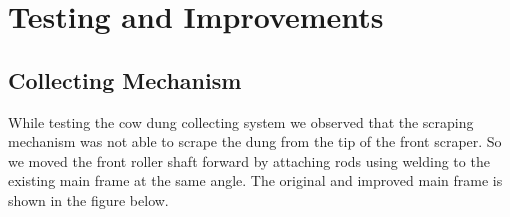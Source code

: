 \chapter{Testing and Improvements} \label{Testing and Improvements}

\section{Collecting Mechanism}

    While testing the cow dung collecting system we observed that the scraping mechanism was not able to scrape the dung from the tip of the front scraper. So we moved the front roller shaft forward by attaching rods using welding to the existing main frame at the same angle. The original and improved main frame is shown in the figure below.

